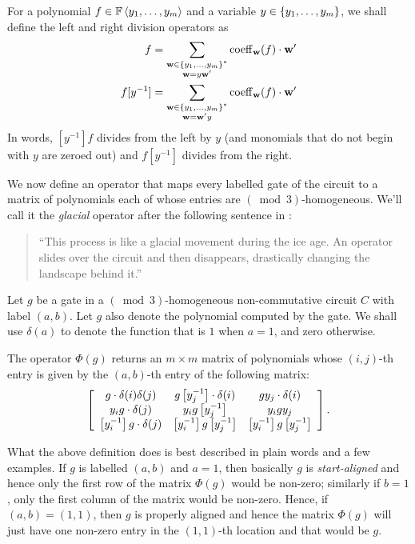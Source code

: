 \begin{definition}
  For a polynomial $f \in \mathbb{F}\left\langle y_1,\ldots, y_m\right\rangle$ and a variable $y \in \left\{y_1,\ldots, y_m\right\}$, we shall define the left and right division operators as
  \begin{align*}
    [y^{-1}] f & = \sum_{\substack{\vecw\in \set{y_1,\ldots, y_m}^*\\ \vecw = y \vecw'}} \coeff_\vecw(f) \cdot \vecw'\\
     f [y^{-1}] & = \sum_{\substack{\vecw\in \set{y_1,\ldots, y_m}^*\\ \vecw = \vecw' y}} \coeff_\vecw(f) \cdot \vecw'
  \end{align*}
  In words, $[y^{-1}] f$ divides from the left by $y$ (and monomials that do not begin with $y$ are zeroed out) and $f [y^{-1}]$ divides from the right. 
\end{definition}

We now define an operator that maps every labelled gate of the circuit to a matrix of polynomials each of whose entries are $(\bmod{3})$-homogeneous. We'll call it the \emph{glacial} operator after the following sentence in \cite{CILM18}:
\begin{quote}
  ``This process is like a glacial movement during the ice age. An operator slides over the circuit and then disappears, drastically changing the landscape behind it.''
\end{quote}

\begin{definition}
  Let $g$ be a gate in a $(\bmod{3})$-homogeneous non-commutative circuit $C$ with label $(a,b)$. Let $g$ also denote the polynomial computed by the gate.
We shall use $\delta(a)$ to denote the function that is $1$ when $a = 1$, and zero otherwise. 

The operator $\Phi(g)$ returns an $m\times m$ matrix of polynomials whose $(i,j)$-th entry is given by the $(a,b)$-th entry of the following matrix:
\begin{align*}
  \left[
  \begin{array}{ccc}
    g \cdot \delta(i)\delta(j) & g\left[y_j^{-1}\right] \cdot \delta(i) & g y_j \cdot \delta(i)\\
    y_i g \cdot \delta(j) & y_i g\left[y_j^{-1}\right] & y_i gy_j\\
    \left[y_i^{-1}\right] g \cdot \delta(j) & \left[y_i^{-1}\right] g\left[y_j^{-1}\right] & \left[y_i^{-1}\right] g\left[y_j^{-1}\right]\\
  \end{array}
  \right].
\end{align*}
\end{definition}
What the above definition does is best described in plain words and a few examples. If $g$ is labelled $(a,b)$ and $a = 1$, then basically $g$ is \emph{start-aligned} and hence only the first row of the matrix $\Phi(g)$ would be non-zero; similarly if $b = 1$, only the first column of the matrix would be non-zero. Hence, if $(a,b) = (1,1)$, then $g$ is properly aligned and hence the matrix $\Phi(g)$ will just have one non-zero entry in the $(1,1)$-th location and that would be $g$. 


